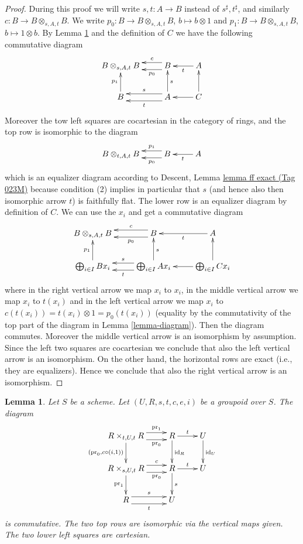 \documentclass{amsart}
\theoremstyle{plain}
\newtheorem{lemma}[subsection]{Lemma}
\theoremstyle{definition}
\theoremstyle{remark}
\numberwithin{equation}{subsection}
\begin{document}
\begin{proof}
During this proof we will write $s, t : A \to B$ instead of
$s^\sharp, t^\sharp$, and similarly $c : B \to B \otimes_{s, A, t} B$.
We write $p_0 : B \to B \otimes_{s, A, t} B$, $b \mapsto b \otimes 1$ and
$p_1 : B \to B \otimes_{s, A, t} B$, $b \mapsto 1 \otimes b$. By
Lemma \ref{lemma-diagram-pull}
and the definition of $C$ we have the following
commutative diagram
$$
\xymatrix{
B \otimes_{s, A, t} B &
B \ar@<-1ex>[l]_-c \ar@<1ex>[l]^-{p_0} &
A \ar[l]^t \\
B \ar[u]^{p_1} &
A \ar@<-1ex>[l]_s \ar@<1ex>[l]^t \ar[u]_s &
C \ar[u] \ar[l]
}
$$
Moreover the tow left squares are cocartesian in the category of rings, and
the top row is isomorphic to the diagram
$$
\xymatrix{
B \otimes_{t, A, t} B &
B \ar@<-1ex>[l]_-{p_1} \ar@<1ex>[l]^-{p_0} &
A \ar[l]^t
}
$$
which is an equalizer diagram according to
Descent, Lemma \href{https://stacks.math.columbia.edu/tag/023M}{lemma ff exact (Tag 023M)} because condition (2) implies
in particular that $s$ (and hence also then isomorphic arrow $t$)
is faithfully flat.
The lower row is an equalizer diagram by definition of $C$.
We can use the $x_i$ and get a commutative diagram
$$
\xymatrix{
B \otimes_{s, A, t} B &
B \ar@<-1ex>[l]_-c \ar@<1ex>[l]^-{p_0} &
A \ar[l]^t \\
\bigoplus_{i \in I} B x_i \ar[u]^{p_1} &
\bigoplus_{i \in I} A x_i \ar@<-1ex>[l]_s \ar@<1ex>[l]^t \ar[u]_s &
\bigoplus_{i \in I} C x_i \ar[u] \ar[l]
}
$$
where in the right vertical arrow we map $x_i$ to $x_i$,
in the middle vertical arrow we map $x_i$ to $t(x_i)$ and
in the left vertical arrow we map $x_i$ to
$c(t(x_i)) = t(x_i) \otimes 1 = p_0(t(x_i))$ (equality by the commutativity
of the top part of the diagram in Lemma \ref{lemma-diagram}). Then the diagram
commutes. Moreover the middle vertical arrow is an isomorphism
by assumption. Since the left two squares are cocartesian we
conclude that also the left vertical arrow is an isomorphism.
On the other hand, the horizontal rows are exact (i.e., they are
equalizers). Hence we conclude that also the right vertical arrow
is an isomorphism.
\end{proof}


\begin{lemma}
\label{lemma-diagram-pull}
Let $S$ be a scheme.
Let $(U, R, s, t, c, e, i)$ be a groupoid over $S$.
The diagram
\begin{equation}
\label{equation-pull}
\xymatrix{
R \times_{t, U, t} R
\ar@<1ex>[r]^-{\text{pr}_1} \ar@<-1ex>[r]_-{\text{pr}_0}
\ar[d]_{(\text{pr}_0, c \circ (i, 1))} &
R \ar[r]^t \ar[d]^{\text{id}_R} &
U \ar[d]^{\text{id}_U} \\
R \times_{s, U, t} R
\ar@<1ex>[r]^-c \ar@<-1ex>[r]_-{\text{pr}_0} \ar[d]_{\text{pr}_1} &
R \ar[r]^t \ar[d]^s &
U \\
R \ar@<1ex>[r]^s \ar@<-1ex>[r]_t &
U
}
\end{equation}
is commutative. The two top rows are isomorphic via the vertical maps given.
The two lower left squares are cartesian.
\end{lemma}
\end{document}
